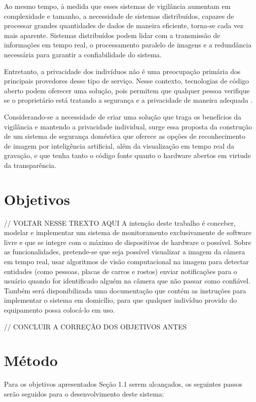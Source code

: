 \documentclass[12pt, %
openright, 
oneside, %
a4paper,    %
brazil]{facom-ufu-abntex2}
\begin{document}
Ao mesmo tempo, à medida que esses sistemas de vigilância aumentam em complexidade e tamanho, a necessidade de sistemas distribuídos,
capazes de processar grandes quantidades de dados de maneira eficiente, torna-se cada vez mais aparente. Sistemas distribuídos
podem lidar com a transmissão de informações em tempo real, o processamento paralelo de imagens e a redundância necessária para garantir a confiabilidade do sistema.

Entretanto, a privacidade dos indivíduos não é uma preocupação primária
dos principais provedores desse tipo de serviço. Nesse contexto,
tecnologias de código aberto podem oferecer uma solução, pois permitem que qualquer pessoa verifique se o proprietário está tratando a segurança e a privacidade de maneira adequada \cite{mardjan2016open}.

Considerando-se a necessidade de criar uma solução que traga os benefícios da vigilância e mantendo a privacidade individual, surge
essa proposta da construção de um sistema de segurança doméstica que oferece as opções de reconhecimento de imagem
por inteligência artificial, além da visualização em tempo real da gravação, e que tenha tanto o código fonte quanto o hardware
abertos em virtude da transparência.

\section{Objetivos}

// VOLTAR NESSE TREXTO AQUI
A intenção deste trabalho é conceber, modelar e implementar um sistema de monitoramento exclusivamente de software livre e que se integre com o máximo de
dispositivos de hardware o possível. Sobre as funcionalidades, pretende-se que seja possível visualizar
a imagem da câmera em tempo real, usar algoritmos de visão computacional na imagem para detectar entidades (como pessoas,
placas de carros e rostos)
enviar notificações para o usuário quando for identificado alguém na câmera que não passar como confiável. Também será disponibilizada uma documentação que
contém as instruções para implementar o sistema em domicílio, para que qualquer indivíduo provido do equipamento possa colocá-lo em uso.

// CONCLUIR A CORREÇÃO DOS OBJETIVOS ANTES

\section{Método}

Para os objetivos apresentados Seção 1.1 serem alcançados, os seguintes passos serão seguidos para o desenvolvimento deste sistema:
\end{document}
